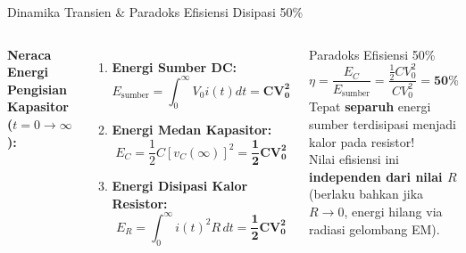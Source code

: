 \documentclass[aspectratio=169,10pt]{beamer}
\begin{document}
\begin{frame}{Dinamika Transien \& Paradoks Efisiensi Disipasi 50\%}
  \begin{columns}[c]
    \textbf{Neraca Energi Pengisian Kapasitor ($t=0 \to \infty$):}
    \begin{enumerate}
      \item \textbf{Energi Sumber DC:}
      \begin{equation*}
        E_{\text{sumber}} = \int_0^\infty V_0 i(t) dt = \mathbf{C V_0^2}
      \end{equation*}
      \item \textbf{Energi Medan Kapasitor:}
      \begin{equation*}
        E_C = \frac{1}{2} C [v_C(\infty)]^2 = \mathbf{\frac{1}{2} C V_0^2}
      \end{equation*}
      \item \textbf{Energi Disipasi Kalor Resistor:}
      \begin{equation*}
        E_R = \int_0^\infty i(t)^2 R \, dt = \mathbf{\frac{1}{2} C V_0^2}
      \end{equation*}
    \end{enumerate}

    \begin{alertblock}{Paradoks Efisiensi 50\%}
      \begin{equation*}
        \eta = \frac{E_C}{E_{\text{sumber}}} = \frac{\frac{1}{2} C V_0^2}{C V_0^2} = \mathbf{50\%}
      \end{equation*}
      Tepat \textbf{separuh} energi sumber terdisipasi menjadi kalor pada resistor! \\
      \vspace{0.1cm}
      Nilai efisiensi ini \textbf{independen dari nilai $R$} (berlaku bahkan jika $R \to 0$, energi hilang via radiasi gelombang EM).
    \end{alertblock}
  \end{columns}
\end{frame}
\end{document}
